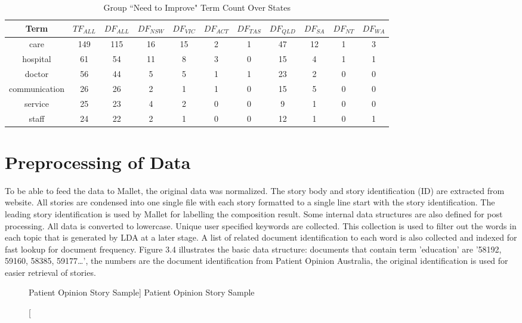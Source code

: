 \documentclass[11pt,twoside]{report}
\begin{document}
\begin{table}[h]
\caption{Group ``Need to Improve" Term Count Over States}
\centering
\begin{tabular}{| c | c | c | c | c | c | c | c |c | c | c |}
\hline\hline
Term & $TF_{ALL}$ & $DF_{ALL}$ & $DF_{NSW}$ & $DF_{VIC}$ & $DF_{ACT}$ & $DF_{TAS}$ & $DF_{QLD}$ & $DF_{SA}$ & $DF_{NT}$ & $DF_{WA}$ \\
\hline
care & 149 & 115 & 16 & 15 & 2 & 1 & 47 & 12 & 1 & 3 \\
\hline
hospital & 61 & 54 & 11 & 8 & 3 & 0 & 15 & 4 & 1 & 1 \\
\hline
doctor & 56 & 44 & 5 & 5 & 1 & 1 & 23 & 2 & 0 & 0 \\
\hline
communication & 26 & 26 & 2 & 1 & 1 & 0 & 15 & 5 & 0 & 0 \\
\hline
service & 25 & 23 & 4 & 2 & 0 & 0 & 9 & 1 & 0 & 0 \\
\hline
staff & 24 & 22 & 2 & 1 & 0 & 0 & 12 & 1 & 0 & 1 \\
\hline
\end{tabular}
\label{table:ImproveCount}
\end{table}

\section{Preprocessing of Data}

To be able to feed the data to Mallet, the original data was normalized. The story body and story identification (ID) are extracted from website. All stories are condensed into one single file with each story formatted to a single line start with the story identification. The leading story identification is used by Mallet for labelling the composition result. Some internal data structures are also defined for post processing. All data is converted to lowercase. Unique user specified keywords are collected. This collection is used to filter out the words in each topic that is generated by LDA at a later stage. A list of related document identification to each word is also collected and indexed for fast lookup for document frequency. Figure 3.4 illustrates the basic data structure: documents that contain term 'education' are '58192, 59160, 58385, 59177…', the numbers are the document identification from Patient Opinion Australia, the original identification is used for easier retrieval of stories.

\begin{figure}[tp]
    \begin{center}
    \caption
    [Patient Opinion Story Sample]
    {
    Patient Opinion Story Sample
    \label{Figure4}
    }
    \end{center}
\end{figure}
\end{document}
